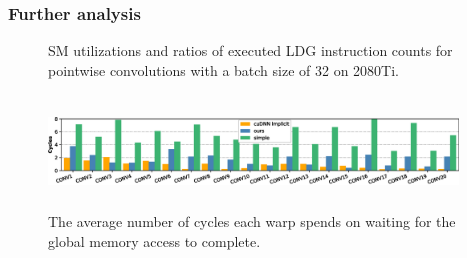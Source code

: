 \subsubsection{Further analysis}
\begin{figure}[t!]
    \centering
    \qquad

    \vspace{-2mm}
    \caption{SM utilizations and ratios of executed LDG instruction counts for pointwise convolutions with a batch size of 32 on 2080Ti.}
    \label{fig:pwinfo}
\end{figure}

\begin{figure}[t!]
    \centering
    \includegraphics[width=0.97\textwidth,height=3cm]{./figure/longscore.eps}
    \vspace{-3mm}
    \caption{The average number of cycles each warp spends on waiting for the global memory access to complete.}
    \label{fig:stalllongscore}
\end{figure}

